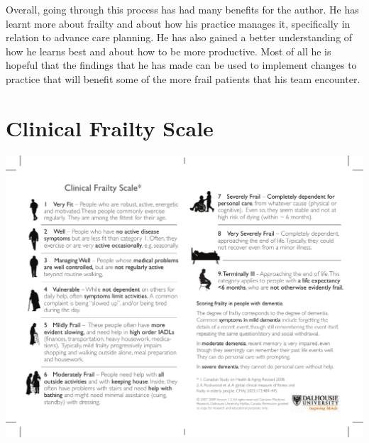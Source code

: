 \documentclass
[
	12pt,
	a4paper,
	oneside,
]{report}
\begin{document}
Overall, going through this process has had many benefits for the author. He 
has learnt more about frailty and about how his practice manages it,
specifically in relation to advance care planning. He has also gained a 
better understanding of how he learns best and about how to be more productive.
Most of all he is hopeful that the 
findings that he has made can be used to implement changes to practice that 
will benefit some of the more frail patients that his team encounter.

\printbibliography[heading=bibintoc]

\clearpage

\appendix

\chapter{Clinical Frailty Scale}
\label{apx:cfs}
\includegraphics[width=\textwidth]{CFS}
\end{document}
